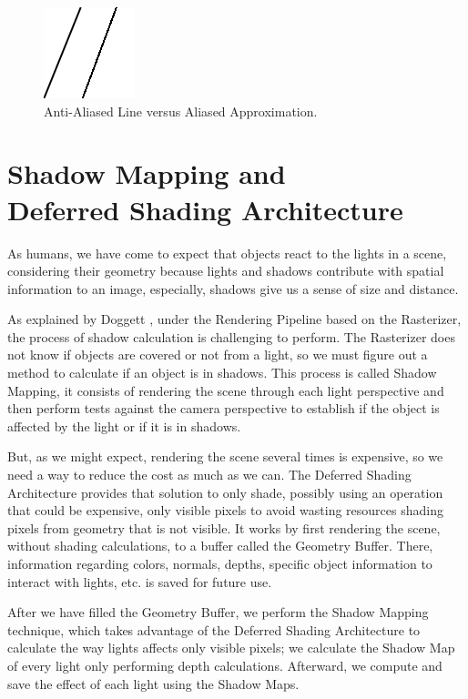 \documentclass{cslthse-msc}
\begin{document}
\begin{figure}[!hbt]
	\centering
	\includegraphics[scale=1.0]{images/aliasing_example.png} 
	\caption{Anti-Aliased Line versus Aliased Approximation.}\label{fig:aliasingexample}
\end{figure}

\section[Shadow Mapping and Deferred Shading Architecture]{Shadow Mapping and \\ Deferred Shading Architecture}

As humans, we have come to expect that objects react to the lights in a scene, considering their geometry because lights and shadows contribute with spatial information to an image, especially, shadows give us a sense of size and distance.

As explained by Doggett \cite{Doggett2017EDAN35}, under the Rendering Pipeline based on the Rasterizer, the process of shadow calculation is challenging to perform. The Rasterizer does not know if objects are covered or not from a light, so we must figure out a method to calculate if an object is in shadows. This process is called Shadow Mapping, it consists of rendering the scene through each light perspective and then perform tests against the camera perspective to establish if the object is affected by the light or if it is in shadows.

But, as we might expect, rendering the scene several times is expensive, so we need a way to reduce the cost as much as we can. The Deferred Shading Architecture provides that solution to only shade, possibly using an operation that could be expensive, only visible pixels to avoid wasting resources shading pixels from geometry that is not visible. It works by first rendering the scene, without shading calculations, to a buffer called the Geometry Buffer. There, information regarding colors, normals, depths, specific object information to interact with lights, etc. is saved for future use. 

After we have filled the Geometry Buffer, we perform the Shadow Mapping technique, which takes advantage of the Deferred Shading Architecture to calculate the way lights affects only visible pixels; we calculate the Shadow Map of every light only performing depth calculations. Afterward, we compute and save the effect of each light using the Shadow Maps. 
\end{document}
